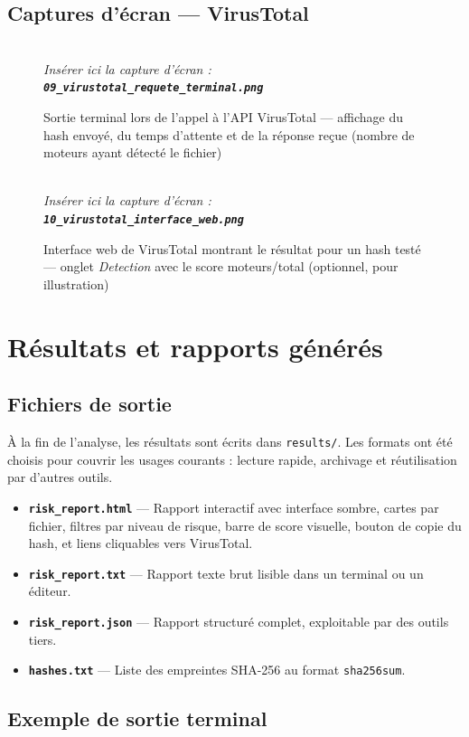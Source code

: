 \documentclass[12pt,a4paper]{article}
\newcommand{\screenshot}[2]{%
  \begin{figure}[H]
    \centering
    \begin{tcolorbox}[
      colback=screenshotbg,
      colframe=screenshotborder,
      fonttitle=\bfseries\small\color{white},
      coltitle=white,
      title={\faCamera\quad Capture d'écran — \texttt{#1}},
      left=6pt, right=6pt, top=6pt, bottom=6pt,
      width=\textwidth,
      arc=4pt
    ]
    \centering
    \vspace{0.4cm}
    \textcolor{gray}{\faImage}\\[4pt]
    {\small\color{gray}\itshape Insérer ici la capture d'écran :\\[2pt]
    \textbf{\texttt{#1}}}
    \vspace{0.4cm}
    \end{tcolorbox}
    \caption{#2}
  \end{figure}%
}
\begin{document}
\subsection{Captures d'écran — VirusTotal}

\screenshot{09\_virustotal\_requete\_terminal.png}{Sortie terminal lors de l'appel à l'API VirusTotal — affichage du hash envoyé, du temps d'attente et de la réponse reçue (nombre de moteurs ayant détecté le fichier)}

\screenshot{10\_virustotal\_interface\_web.png}{Interface web de VirusTotal montrant le résultat pour un hash testé — onglet \textit{Detection} avec le score moteurs/total (optionnel, pour illustration)}

\section{Résultats et rapports générés}

\subsection{Fichiers de sortie}

À la fin de l'analyse, les résultats sont écrits dans \texttt{results/}. Les formats ont été choisis pour couvrir les usages courants : lecture rapide, archivage et réutilisation par d'autres outils.

\begin{itemize}[itemsep=6pt]
  \item \textbf{\texttt{risk\_report.html}} — Rapport interactif avec interface sombre, cartes par fichier, filtres par niveau de risque, barre de score visuelle, bouton de copie du hash, et liens cliquables vers VirusTotal.
  \item \textbf{\texttt{risk\_report.txt}} — Rapport texte brut lisible dans un terminal ou un éditeur.
  \item \textbf{\texttt{risk\_report.json}} — Rapport structuré complet, exploitable par des outils tiers.
  \item \textbf{\texttt{hashes.txt}} — Liste des empreintes SHA-256 au format \texttt{sha256sum}.
\end{itemize}

\subsection{Exemple de sortie terminal}
\end{document}
